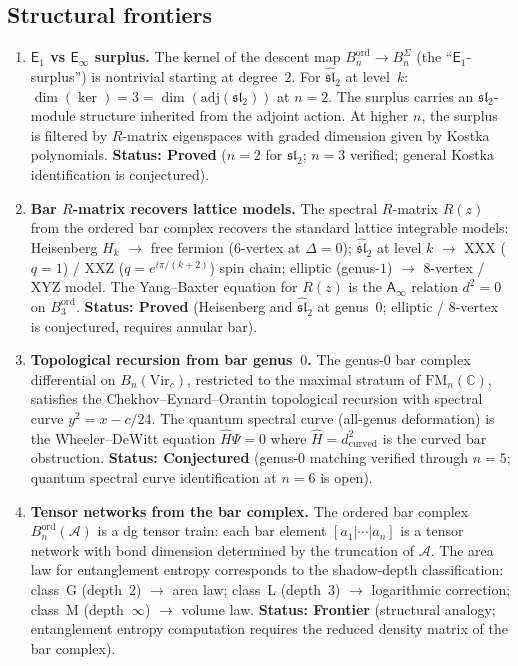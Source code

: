 \documentclass[11pt]{article}
\newcommand{\cA}{\mathcal{A}}
\newcommand{\fsl}{\mathfrak{sl}}
\newcommand{\C}{\mathbb{C}}
\newcommand{\Eone}{\mathsf{E}_1}
\newcommand{\Einf}{\mathsf{E}_{\infty}}
\newcommand{\Ainf}{\mathsf{A}_{\infty}}
\newcommand{\FM}{\mathrm{FM}}
\begin{document}
\subsection{Structural frontiers}
\label{ssec:struct-frontiers}

\begin{enumerate}[label=\textbf{S\arabic*.},leftmargin=2.5em]

\item \textbf{$\Eone$ vs $\Einf$ surplus.}
The kernel of the descent map $B^{\mathrm{ord}}_n \to B^{\Sigma}_n$
(the ``$\Eone$-surplus'') is nontrivial starting at degree~$2$.
For $\hat{\fsl}_2$ at level~$k$: $\dim(\ker) = 3 = \dim(\mathrm{adj}(\fsl_2))$
at $n = 2$.  The surplus carries an $\fsl_2$-module structure inherited
from the adjoint action.  At higher $n$, the surplus is filtered by
$R$-matrix eigenspaces with graded dimension given by Kostka polynomials.
\textbf{Status: Proved} ($n = 2$ for $\fsl_2$; $n = 3$ verified;
general Kostka identification is conjectured).

\item \textbf{Bar $R$-matrix recovers lattice models.}
The spectral $R$-matrix $R(z)$ from the ordered bar complex recovers
the standard lattice integrable models:
Heisenberg $H_k$ $\to$ free fermion (6-vertex at $\Delta = 0$);
$\hat{\fsl}_2$ at level $k$ $\to$ XXX ($q = 1$) / XXZ ($q = e^{i\pi/(k+2)}$)
spin chain; elliptic (genus-$1$) $\to$ 8-vertex / XYZ model.
The Yang--Baxter equation for $R(z)$ is the $\Ainf$ relation
$d^2 = 0$ on $B^{\mathrm{ord}}_3$.
\textbf{Status: Proved} (Heisenberg and $\hat{\fsl}_2$ at genus~$0$;
elliptic / 8-vertex is conjectured, requires annular bar).

\item \textbf{Topological recursion from bar genus~$0$.}
The genus-$0$ bar complex differential on $B_n(\mathrm{Vir}_c)$,
restricted to the maximal stratum of $\FM_n(\C)$, satisfies the
Chekhov--Eynard--Orantin topological recursion with spectral curve
$y^2 = x - c/24$.  The quantum spectral curve (all-genus deformation)
is the Wheeler--DeWitt equation $\hat{H}\Psi = 0$ where
$\hat{H} = d^2_{\mathrm{curved}}$ is the curved bar obstruction.
\textbf{Status: Conjectured} (genus-$0$ matching verified through
$n = 5$; quantum spectral curve identification at $n = 6$ is open).

\item \textbf{Tensor networks from the bar complex.}
The ordered bar complex $B^{\mathrm{ord}}_n(\cA)$ is a dg tensor train:
each bar element $[a_1 | \cdots | a_n]$ is a tensor network with
bond dimension determined by the truncation of $\cA$.  The area law
for entanglement entropy corresponds to the shadow-depth classification:
class~G (depth~$2$) $\to$ area law; class~L (depth~$3$) $\to$
logarithmic correction; class~M (depth~$\infty$) $\to$ volume law.
\textbf{Status: Frontier} (structural analogy; entanglement entropy
computation requires the reduced density matrix of the bar complex).


\end{enumerate}
\end{document}
